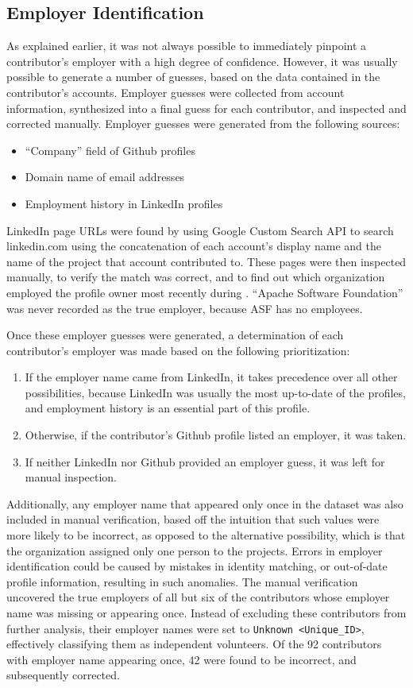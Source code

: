 \subsection{Employer Identification}\label{employersec}
As explained earlier, it was not always possible to immediately pinpoint a contributor's employer with a high degree of confidence. However, it was usually possible to generate a number of guesses, 
based on the data contained in the contributor's accounts. Employer guesses were collected from account information, synthesized into a final guess for each contributor, and inspected and corrected manually.
Employer guesses were generated from the following sources:
\begin{itemize}
	\item ``Company'' field of Github profiles
	\item Domain name of email addresses
	\item Employment history in LinkedIn profiles
\end{itemize}
LinkedIn page URLs were found by using Google Custom Search API to search linkedin.com using the concatenation of each account's display name and the name of the project that account contributed to. These pages were then inspected manually, to verify the match was correct, and to find out which organization employed the profile owner most recently during \timeperiod{}. ``Apache Software Foundation'' was never recorded as the true employer, because ASF has no employees\cite{asf}.

Once these employer guesses were generated, a determination of each contributor's employer was made based on the following prioritization:
\begin{enumerate}
	\item If the employer name came from LinkedIn, it takes precedence over all other possibilities, because LinkedIn was usually the most up-to-date of the profiles, and employment history is an essential part of this profile.
	\item Otherwise, if the contributor's Github profile listed an employer, it was taken.
	\item If neither LinkedIn nor Github provided an employer guess, it was left for manual inspection.
\end{enumerate}
Additionally, any employer name that appeared only once in the dataset was also included in manual verification, based off the intuition that such values were more likely to be incorrect, as opposed to the alternative possibility, which is that the organization assigned only one person to the projects. Errors in employer identification could be caused by mistakes in identity matching, or out-of-date profile information, resulting in such anomalies.
The manual verification uncovered the true employers of all but six of the contributors whose employer name was missing or appearing once. Instead of excluding these contributors from further analysis, their employer names were set to \verb|Unknown <Unique_ID>|, effectively classifying them as independent volunteers. Of the 92 contributors with employer name appearing once, 42 were found to be incorrect, and subsequently corrected.


